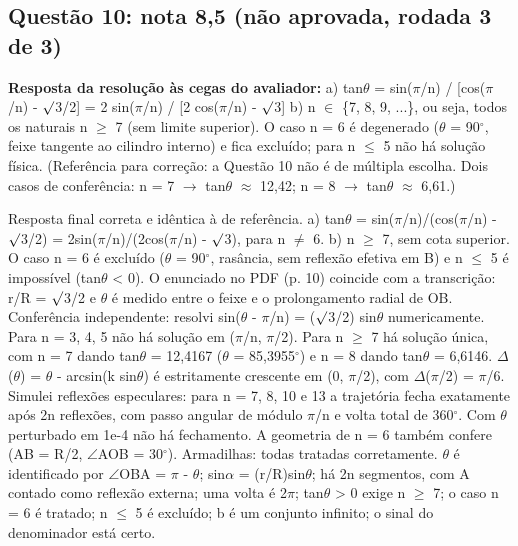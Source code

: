 \documentclass{article}%
\begin{document}
\subsection*{Questão 10: nota 8,5 (não aprovada, rodada 3 de 3)}%
\textbf{Resposta da resolução às cegas do avaliador:} a) tan$\theta$ = sin($\pi$/n) / {[}cos($\pi$/n) - $\surd$3/2{]} = 2 sin($\pi$/n) / {[}2 cos($\pi$/n) - $\surd$3{]}\newline%
\newline%
b) n $\in$ \{7, 8, 9, ...\}, ou seja, todos os naturais n $\geq$ 7 (sem limite superior). O caso n = 6 é degenerado ($\theta$ = 90$^\circ$, feixe tangente ao cilindro interno) e fica excluído; para n $\leq$ 5 não há solução física.\newline%
\newline%
(Referência para correção: a Questão 10 não é de múltipla escolha. Dois casos de conferência: n = 7 $\to$ tan$\theta$ $\approx$ 12,42; n = 8 $\to$ tan$\theta$ $\approx$ 6,61.)\par %
Resposta final correta e idêntica à de referência. a) tan$\theta$ = sin($\pi$/n)/(cos($\pi$/n) - $\surd$3/2) = 2sin($\pi$/n)/(2cos($\pi$/n) - $\surd$3), para n $\neq$ 6. b) n $\geq$ 7, sem cota superior. O caso n = 6 é excluído ($\theta$ = 90$^\circ$, rasância, sem reflexão efetiva em B) e n $\leq$ 5 é impossível (tan$\theta$ < 0). O enunciado no PDF (p. 10) coincide com a transcrição: r/R = $\surd$3/2 e $\theta$ é medido entre o feixe e o prolongamento radial de OB.\newline%
\newline%
Conferência independente: resolvi sin($\theta$ - $\pi$/n) = ($\surd$3/2) sin$\theta$ numericamente. Para n = 3, 4, 5 não há solução em ($\pi$/n, $\pi$/2). Para n $\geq$ 7 há solução única, com n = 7 dando tan$\theta$ = 12,4167 ($\theta$ = 85,3955$^\circ$) e n = 8 dando tan$\theta$ = 6,6146. $\Delta$($\theta$) = $\theta$ - arcsin(k sin$\theta$) é estritamente crescente em (0, $\pi$/2), com $\Delta$($\pi$/2) = $\pi$/6. Simulei reflexões especulares: para n = 7, 8, 10 e 13 a trajetória fecha exatamente após 2n reflexões, com passo angular de módulo $\pi$/n e volta total de 360$^\circ$. Com $\theta$ perturbado em 1e{-}4 não há fechamento. A geometria de n = 6 também confere (AB = R/2, $\angle$AOB = 30$^\circ$).\newline%
\newline%
Armadilhas: todas tratadas corretamente. $\theta$ é identificado por $\angle$OBA = $\pi$ - $\theta$; sin$\alpha$ = (r/R)sin$\theta$; há 2n segmentos, com A contado como reflexão externa; uma volta é 2$\pi$; tan$\theta$ > 0 exige n $\geq$ 7; o caso n = 6 é tratado; n $\leq$ 5 é excluído; b é um conjunto infinito; o sinal do denominador está certo.\newline%
\end{document}
